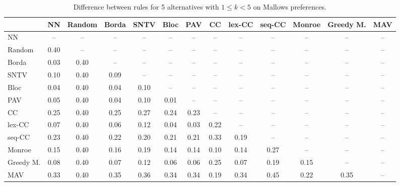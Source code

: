 
\begin{table*}[h!]
\centering
\begin{tabular}{lcccccccccccc}
\toprule
 & NN & Random & Borda & SNTV & Bloc & PAV & CC & lex-CC & seq-CC & Monroe & Greedy M. & MAV \\
\midrule
NN & -- & -- & -- & -- & -- & -- & -- & -- & -- & -- & -- & -- \\
Random & 0.40 & -- & -- & -- & -- & -- & -- & -- & -- & -- & -- & -- \\
Borda & 0.03 & 0.40 & -- & -- & -- & -- & -- & -- & -- & -- & -- & -- \\
SNTV & 0.10 & 0.40 & 0.09 & -- & -- & -- & -- & -- & -- & -- & -- & -- \\
Bloc & 0.04 & 0.40 & 0.04 & 0.10 & -- & -- & -- & -- & -- & -- & -- & -- \\
PAV & 0.05 & 0.40 & 0.04 & 0.10 & 0.01 & -- & -- & -- & -- & -- & -- & -- \\
CC & 0.25 & 0.40 & 0.25 & 0.27 & 0.24 & 0.23 & -- & -- & -- & -- & -- & -- \\
lex-CC & 0.07 & 0.40 & 0.06 & 0.12 & 0.04 & 0.03 & 0.22 & -- & -- & -- & -- & -- \\
seq-CC & 0.23 & 0.40 & 0.22 & 0.20 & 0.21 & 0.21 & 0.33 & 0.19 & -- & -- & -- & -- \\
Monroe & 0.15 & 0.40 & 0.16 & 0.19 & 0.14 & 0.14 & 0.10 & 0.14 & 0.27 & -- & -- & -- \\
Greedy M. & 0.08 & 0.40 & 0.07 & 0.12 & 0.06 & 0.06 & 0.25 & 0.07 & 0.19 & 0.15 & -- & -- \\
MAV & 0.33 & 0.40 & 0.35 & 0.36 & 0.34 & 0.34 & 0.19 & 0.34 & 0.45 & 0.22 & 0.35 & -- \\
\bottomrule
\end{tabular}

\caption{Difference between rules for 5 alternatives with $1 \leq k < 5$ on Mallows preferences.}
\end{table*}
